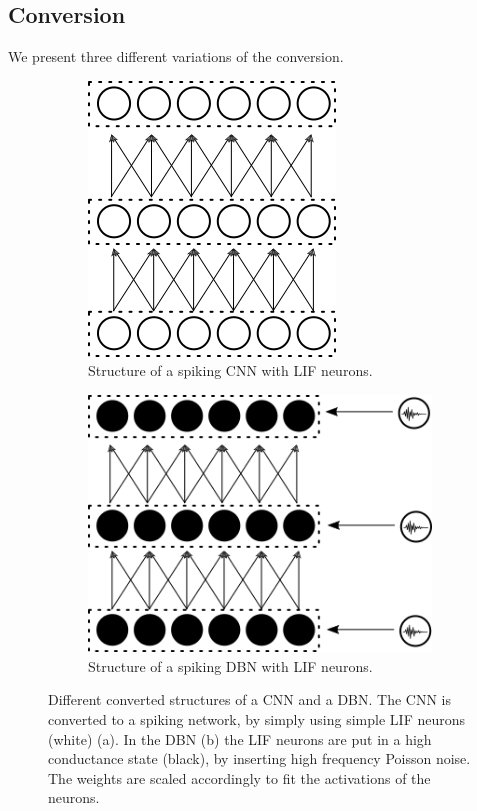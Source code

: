 \subsection{Conversion} \label{c:conversionappr}

We present three different variations of the conversion.

\begin{figure}
	\centering
	\begin{subfigure}[t]{.5\textwidth}
  		\centering
  		\includegraphics[width=.54\linewidth]{imgs/convert_cnn.png}
  		\caption{Structure of a spiking CNN with LIF neurons.}
  		\label{fig:converted1}
	\end{subfigure}%
	\begin{subfigure}[t]{.5\textwidth}
  		\centering
  		\includegraphics[width=.8\linewidth]{imgs/convert_dbn.png}
  		\caption{Structure of a spiking DBN with LIF neurons.}
  		\label{fig:converted2}
  	\end{subfigure}
	\caption[Different converted structures of a CNN and a DBN.]{Different converted structures of a CNN and a DBN. The CNN is converted to a spiking network, by simply using simple LIF neurons (white) (a). In the DBN (b) the LIF neurons are put in a high conductance state (black), by inserting high frequency Poisson noise. The weights are scaled accordingly to fit the activations of the neurons.}
	\label{fig:converted}
\end{figure}


